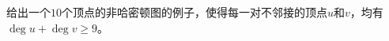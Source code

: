 \begin{Exercise}
  给出一个$10$个顶点的非哈密顿图的例子，使得每一对不邻接的顶点$u$和$v$，均有$\deg u + \deg v \geq 9$。
\end{Exercise}
